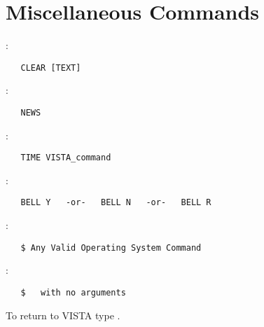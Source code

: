 
\section{Miscellaneous Commands}

:
\begin{verbatim}
   CLEAR [TEXT]
\end{verbatim}

\noindent {}:
\begin{verbatim}
   NEWS
\end{verbatim}

\noindent {}:
\begin{verbatim}
   TIME VISTA_command
\end{verbatim}

\noindent {}:
\begin{verbatim}
   BELL Y   -or-   BELL N   -or-   BELL R
\end{verbatim}

\noindent {}:
\begin{verbatim}
   $ Any Valid Operating System Command
\end{verbatim}

\noindent {}:
\begin{verbatim}
   $   with no arguments
\end{verbatim}
To return to VISTA type .

%
